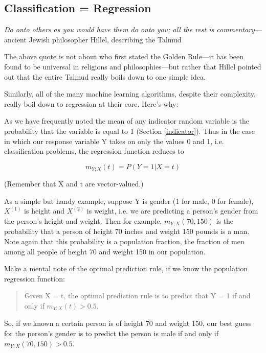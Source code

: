 \subsection{Classification = Regression}
\label{meanisprob}

{\it Do onto others as you would have them do onto you; all the rest is
commentary}---ancient Jewish philosopher Hillel, describing the Talmud

The above quote is not about who first stated the Golden Rule---it has
been found to be universal in religions and philosophies---but rather
that Hillel pointed out that the entire Talmud really boils down to one
simple idea.

Similarly, all of the many machine learning algorithms, despite their
complexity, really boil down to regression at their core.  Here's why:

As we have frequently noted the mean of any indicator random variable is
the probability that the variable is equal to 1 (Section
\ref{indicator}).  Thus in the case in which our response variable Y
takes on only the values 0 and 1, i.e.  classification problems, the
regression function reduces to

\begin{equation}
m_{Y;X}(t) = P(Y = 1 | X = t)
\end{equation}

(Remember that X and t are vector-valued.)

As a simple but handy example, suppose Y is gender (1 for male, 0 for
female), $X^{(1)}$ is height and $X^{(2)}$ is weight, i.e. we are
predicting a person's gender from the person's height and weight.  Then
for example, $m_{Y;X}(70,150)$ is the probability that a person of
height 70 inches and weight 150 pounds is a man.  Note again that this
probability is a population fraction, the fraction of men among all
people of height 70 and weight 150 in our population.

Make a mental note of the optimal prediction rule, if we know the
population regression function:

\begin{quote}
Given X = t, the optimal prediction rule is to predict that Y = 1 if and
only if $m_{Y;X}(t) > 0.5$.
\end{quote}

So, if we known a certain person is of height 70 and weight 150, our
best guess for the person's gender is to predict the person is male
if and only if $m_{Y;X}(70,150) > 0.5$.


